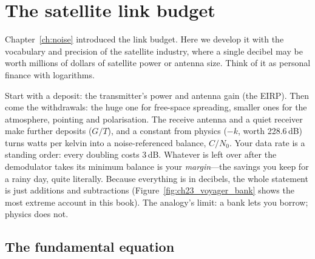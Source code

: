 \section{The satellite link budget}
\label{sec:ch23:linkbudget}

Chapter~\ref{ch:noise} introduced the link budget. Here we develop it with the vocabulary and
precision of the satellite industry, where a single decibel may be worth millions of dollars of
satellite power or antenna size. Think of it as personal finance with logarithms.

\begin{analogy}
Start with a deposit: the transmitter's power and antenna gain (the EIRP). Then come the
withdrawals: the huge one for free-space spreading, smaller ones for the atmosphere, pointing and
polarisation. The receive antenna and a quiet receiver make further deposits ($G/T$), and a
constant from physics ($-k$, worth 228.6\,dB) turns watts per kelvin into a noise-referenced
balance, $C/N_0$. Your data rate is a standing order: every doubling costs 3\,dB. Whatever is
left over after the demodulator takes its minimum balance is your \emph{margin}---the savings you
keep for a rainy day, quite literally. Because everything is in decibels, the whole statement is
just additions and subtractions (Figure~\ref{fig:ch23_voyager_bank} shows the most extreme account
in this book). The analogy's limit: a bank lets you borrow; physics does not.
\end{analogy}

\subsection{The fundamental equation}

